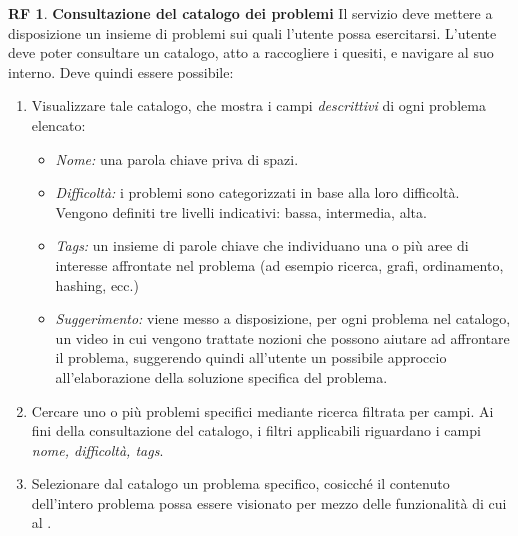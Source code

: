 \documentclass[11pt, a4paper]{article}
\theoremstyle{definition}
\newtheorem{funcreq}{RF} %
\begin{document}
\begin{funcreq}
\label{probcatalogue}
\textbf{Consultazione del catalogo dei problemi }
Il servizio deve mettere a disposizione un insieme di problemi sui quali
l'utente possa esercitarsi. L'utente deve poter consultare un catalogo,
atto a raccogliere i quesiti, e navigare al suo interno. Deve quindi
essere possibile:
\begin{enumerate}
    \item Visualizzare tale catalogo, che mostra i campi \textit{descrittivi}
    di ogni problema elencato:
    \begin{itemize}
        \item \textit{Nome:} una parola chiave priva di spazi.
        
        \item \textit{Difficoltà:} i problemi sono categorizzati in base alla
        loro difficoltà. Vengono definiti tre livelli indicativi:
        bassa, intermedia, alta.
        
        \item \textit{Tags:} un insieme di parole chiave che individuano una
        o più aree di interesse affrontate nel problema (ad esempio ricerca,
        grafi, ordinamento, hashing, ecc.)

        \item \textit{Suggerimento:} viene messo a disposizione, per ogni
        problema nel catalogo, un video in cui vengono trattate nozioni che
        possono aiutare ad affrontare il problema, suggerendo quindi all'utente un
        possibile approccio all'elaborazione della soluzione specifica del
        problema.
    \end{itemize}
    
    \item Cercare uno o più problemi specifici mediante ricerca filtrata per campi.
    Ai fini della consultazione del catalogo, i filtri applicabili riguardano i
    campi \textit{nome, difficoltà, tags}.

    \item Selezionare dal catalogo un problema specifico, cosicché
    il contenuto dell'intero problema possa essere visionato per mezzo
    delle funzionalità di cui al \textcolor{blue}{}.
\end{enumerate}
\end{funcreq}
\end{document}
